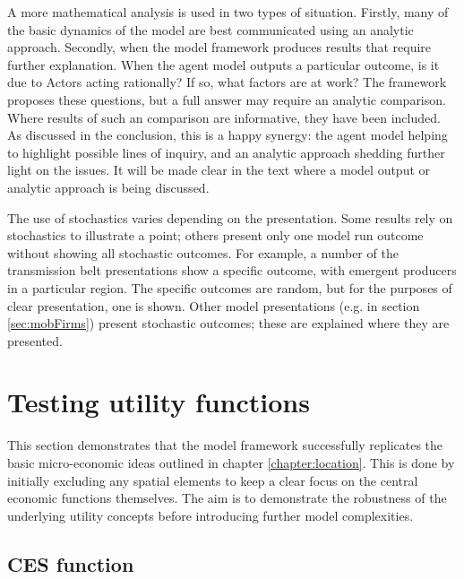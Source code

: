 A more mathematical analysis is used in two types of situation. Firstly, many of the basic dynamics of the model are best communicated using an analytic approach. Secondly, when the model framework produces results that require further explanation. When the agent model outputs a particular outcome, is it due to Actors acting rationally? If so, what factors are at work? The framework proposes these questions, but a full answer may require an analytic comparison. Where results of such an comparison are informative, they have been  included. As discussed in the conclusion, this is a happy synergy: the  agent model helping to highlight possible lines of inquiry, and an analytic approach  shedding further light on the issues. It will be made clear in the text where a model output or analytic approach is being discussed.

The use of stochastics varies depending on the presentation. Some results rely on stochastics to illustrate a point; others present only one model run outcome without showing all stochastic outcomes. For example, a number of the transmission belt presentations show a specific outcome, with emergent producers in a particular region. The specific outcomes are random, but for the purposes of clear presentation, one is shown. Other model presentations (e.g. in section \ref{sec:mobFirms}) present stochastic outcomes; these are explained where they are presented.


\section{Testing utility functions \label{sec:testingutils}}

This section demonstrates that the model framework successfully replicates the basic micro-economic ideas outlined in chapter \ref{chapter:location}. This is done by initially excluding any spatial elements to keep a clear focus on the central economic functions themselves. The aim is to demonstrate the robustness of the underlying utility concepts before introducing further model complexities.

\subsection{CES function}


